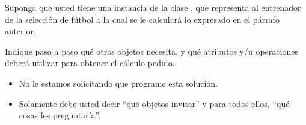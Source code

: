 \documentclass[11pt,letterpaper]{article}
\begin{document}
\begin{spacing}{1.2}
\begin{Problem}
\begin{ProbPart}
Suponga que usted tiene una instancia de la clase , que representa al entrenador de la
selección de fútbol a la cual se le calculará lo expresado en el párrafo anterior.

Indique paso a paso qué otros objetos necesita, y qué atributos y/u operaciones deberá utilizar para
obtener el cálculo pedido. 

\begin{itemize}[itemsep=0pt]
    \item No le estamos solicitando que programe esta solución.
    \item Solamente debe usted decir ``qué objetos invitar'' y para todos ellos, ``qué cosas les preguntaría''.
\end{itemize}
\end{ProbPart}

\end{Problem}


\end{spacing}
\end{document}

